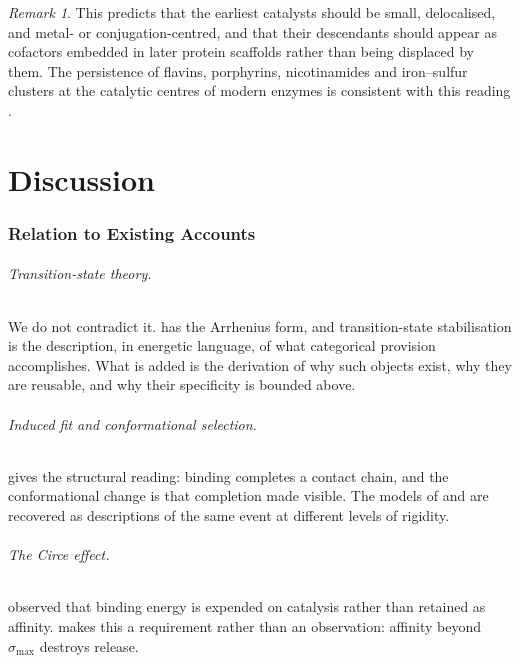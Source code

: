\documentclass[11pt,twocolumn,a4paper]{article}
\theoremstyle{plain}
\theoremstyle{definition}
\theoremstyle{remark}
\newtheorem{remark}[theorem]{Remark}
\begin{document}
\begin{remark}
This predicts that the earliest catalysts should be small, delocalised, and
metal- or conjugation-centred, and that their descendants should appear as
cofactors embedded in later protein scaffolds rather than being displaced by
them. The persistence of flavins, porphyrins, nicotinamides and iron--sulfur
clusters at the catalytic centres of modern enzymes is consistent with this
reading \citep{wachtershauser1988,martin2008}.
\end{remark}

\part{Discussion}

\section{Relation to Existing Accounts}
\label{sec:relation}

\paragraph{Transition-state theory.} We do not contradict it. 
has the Arrhenius form, and transition-state stabilisation is the description,
in energetic language, of what categorical provision accomplishes. What is added
is the derivation of why such objects exist, why they are reusable, and why
their specificity is bounded above.

\paragraph{Induced fit and conformational selection.}  gives
the structural reading: binding completes a contact chain, and the conformational
change is that completion made visible. The models of \citet{fischer1894} and
\citet{koshland1958} are recovered as descriptions of the same event at
different levels of rigidity.

\paragraph{The Circe effect.}  observed that binding energy is
expended on catalysis rather than retained as affinity.  makes
this a requirement rather than an observation: affinity beyond $\sigma_{\max}$
destroys release.
\end{document}
